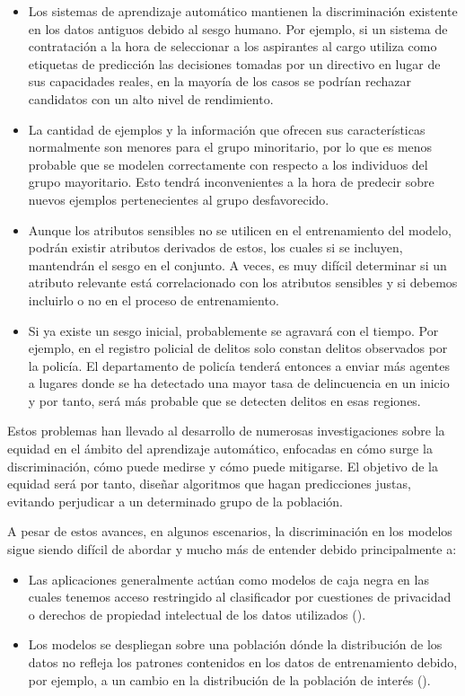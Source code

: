 \documentclass[oneside,openright,titlepage,numbers=noenddot,openany,headinclude,footinclude=true,
cleardoublepage=empty,abstractoff,BCOR=5mm,paper=a4,fontsize=12pt,main=spanish]{scrreprt}
\begin{document}
\begin{itemize}
    \item Los sistemas de aprendizaje automático mantienen la discriminación existente en los datos antiguos debido al sesgo humano. Por ejemplo, si un sistema de contratación a la hora de seleccionar a los aspirantes al cargo utiliza como etiquetas de predicción las decisiones tomadas por un directivo en lugar de sus capacidades reales, en la mayoría de los casos se podrían rechazar candidatos con un alto nivel de rendimiento.
    \item La cantidad de ejemplos y la información que ofrecen sus características normalmente son menores para el grupo minoritario, por lo que es menos probable que se modelen correctamente con respecto a los individuos del grupo mayoritario. Esto tendrá inconvenientes a la hora de predecir sobre nuevos ejemplos pertenecientes al grupo desfavorecido.
    \item Aunque los atributos sensibles no se utilicen en el entrenamiento del modelo, podrán existir atributos derivados de estos, los cuales si se incluyen, mantendrán el sesgo en el conjunto. A veces, es muy difícil determinar si un atributo relevante está correlacionado con los atributos sensibles y si debemos incluirlo o no en el proceso de entrenamiento.
    \item Si ya existe un sesgo inicial, probablemente se agravará con el tiempo. Por ejemplo, en el registro policial de delitos solo constan delitos observados por la policía. El departamento de policía tenderá entonces a enviar más agentes a lugares donde se ha detectado una mayor tasa de delincuencia en un inicio y por tanto, será más probable que se detecten delitos en esas regiones. 
\end{itemize}

Estos problemas han llevado al desarrollo de numerosas investigaciones sobre la equidad en el ámbito del aprendizaje automático, enfocadas en cómo surge la discriminación, cómo puede medirse y cómo puede mitigarse. El objetivo de la equidad será por tanto, diseñar algoritmos que hagan predicciones justas, evitando perjudicar a un determinado grupo de la población.

A pesar de estos avances, en algunos escenarios, la discriminación en los modelos sigue siendo difícil de abordar y mucho más de entender debido principalmente a: 

\begin{itemize}
    \item Las aplicaciones generalmente actúan como modelos de caja negra en las cuales tenemos acceso restringido al clasificador por cuestiones de privacidad o derechos de propiedad intelectual de los datos utilizados (\cite{blackbox2014}).
	\item Los modelos se despliegan sobre una población dónde la distribución de los datos no refleja los patrones contenidos en los datos de entrenamiento debido, por ejemplo, a un cambio en la distribución de la población de interés (\cite{distributionmodel2017}).
\end{itemize}
\end{document}
